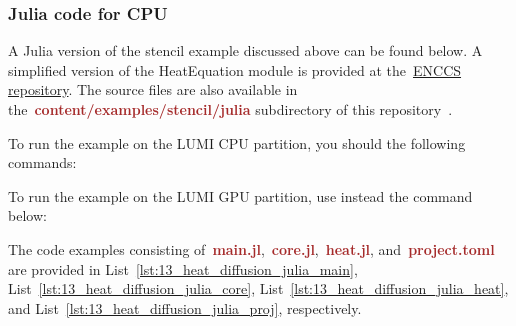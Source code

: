 \subsubsection{Julia code for CPU}


\par
A Julia version of the stencil example discussed above can be found below.
A simplified version of the HeatEquation module is provided at the~\href{https://github.com/ENCCS/HeatEquation.jl}{ENCCS repository}.
The source files are also available in the~\textbf{\textcolor{brown}{content/examples/stencil/julia}} subdirectory of this repository~\cite{gpu-programming-examples}.


\par
To run the example on the LUMI CPU partition, you should the following commands:



\par
To run the example on the LUMI GPU partition, use instead the command below:



\par
The code examples consisting of~\textbf{\textcolor{brown}{main.jl}},~\textbf{\textcolor{brown}{core.jl}},~\textbf{\textcolor{brown}{heat.jl}}, and~\textbf{\textcolor{brown}{project.toml}} are provided in List~\ref{lst:13_heat_diffusion_julia_main}, List~\ref{lst:13_heat_diffusion_julia_core}, List~\ref{lst:13_heat_diffusion_julia_heat}, and List~\ref{lst:13_heat_diffusion_julia_proj}, respectively.











